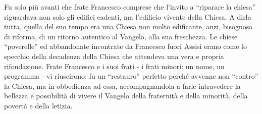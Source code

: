 Fu solo più avanti che frate Francesco comprese che l’invito a “riparare la chiesa”
riguardava non solo gli edifici cadenti, ma l’edificio vivente della Chiesa. A dirla tutta, quella  del 
suo tempo era una Chiesa non molto edificante, anzi, bisognosa  di riforma, di un ritorno autentico 
al Vangelo, alla sua freschezza. Le chiese “poverelle” ed abbandonate incontrate da Francesco fuori 
Assisi erano come lo specchio della decadenza della Chiesa che attendeva  una vera e propria 
rifondazione. Frate Francesco e i suoi frati - i frati minori: un nome, un programma  - vi riuscirono: 
fu un “restauro” perfetto perché avvenne non “contro” la Chiesa, ma in obbedienza ad essa, 
accompagnandola a farle intravedere la bellezza e possibilità di vivere il Vangelo della fraternità e 
della minorità, della povertà e della letizia.

